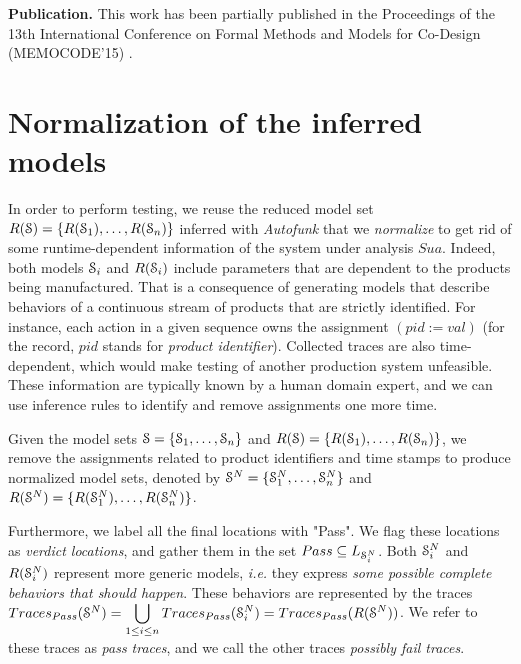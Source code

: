 \textbf{Publication.} This work has been partially published in
the Proceedings of the 13th International Conference on Formal
Methods and Models for Co-Design (MEMOCODE'15) \cite{7340480}.


\section{Normalization of the inferred models}
\label{sec:testing:normal}

In order to perform testing, we reuse the reduced model set
$R(\EuScript{S}) = \{R(\EuScript{S}_1),\dots,R(\EuScript{S}_n)\\
\}$ inferred with \textit{Autofunk} that we \textit{normalize} to
get rid of some runtime-dependent information of the system under
analysis $\mathit{Sua}$. Indeed, both models $\EuScript{S}_i$ and
$R(\EuScript{S}_i)$ include parameters that are dependent to the
products being manufactured. That is a consequence of generating
models that describe behaviors of a continuous stream of products
that are strictly identified. For instance, each action in a
given sequence owns the assignment $(pid := val)$ (for the
record, $pid$ stands for \emph{product identifier}). Collected
traces are also time-dependent, which would make testing of
another production system unfeasible. These information are
typically known by a human domain expert, and we can use
inference rules to identify and remove assignments one more time.

Given the model sets $\EuScript{S} =
\{\EuScript{S}_1,\dots,\EuScript{S}_n\}$ and $R(\EuScript{S}) =
\{R(\EuScript{S}_1),\dots,R(\EuScript{S}_n)\}$, we remove the
assignments related to product identifiers and time stamps to
produce normalized model sets, denoted by $\EuScript{S}^{N} = \{
\EuScript{S}_1^{N}, \dots, \EuScript{S}_n^{N} \}$ and
$R(\EuScript{S}^{N}) = \{ R(\EuScript{S}_1^{N}), \dots,
R(\EuScript{S}_n^{N}) \}$.

Furthermore, we label all the final locations with
"Pass". We flag these locations as \emph{verdict locations}, and
gather them in the set $Pass \subseteq L_{\EuScript{S}_i^{N}}$.
Both $\EuScript{S}_i^{N}$ and $R(\EuScript{S}_i^{N})$ represent more
generic models, \emph{i.e.}  they express \textit{some possible
complete behaviors that should happen}. These behaviors are
represented by the traces $Traces_{Pass}
(\EuScript{S}^{N})=\displaystyle \bigcup_{1 \leq i \leq n}
Traces_{Pass} (\EuScript{S}_i^{N})=Traces_{Pass}
(R(\EuScript{S}^{N}))$. We refer to these traces as \textit{pass
traces}, and we call the other traces \textit{possibly fail
traces}.

